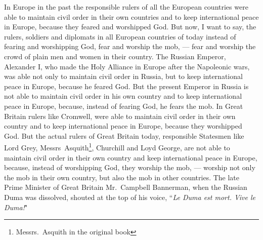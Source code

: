 In Europe in the past the responsible rulers of all the European countries were able to maintain civil order in their own countries and to keep international peace in Europe, because they feared and worshipped God.
But now, I want to say, the rulers, soldiers and diplomats in all European countries of today instead of fearing and worshipping God, fear and worship the mob, --- fear and worship the crowd of plain men and women in their country.
The Russian Emperor, Alexander I,  who made the Holy Alliance in Europe after the Napoleonic wars, was able not only to maintain civil order in Russia, but to keep international peace in Europe, because he feared God.
But the present Emperor in Russia is not able to maintain civil order in his own country and to keep international peace in Europe, because, instead of fearing God, he fears the mob.
In Great Britain rulers like Cromwell, were able to maintain civil order in their own country and to keep international peace in Europe, because they worshipped God.
But the actual rulers of Great Britain today, responsible Statesmen like Lord Grey,  Messrs~Asquith\footnote{Messrs.~Asquith in the original book},  Churchill  and Loyd George,  are not able to maintain civil order in their own country and keep international peace in Europe, because, instead of worshipping God, they worship the mob, --- worship not only the mob in their own country, but also the mob in other countries.
The late Prime Minister of Great Britain Mr.~Campbell Bannerman,  when the Russian Duma was dissolved, shouted at the top of his voice, ``\emph{Le Duma est mort. Vive le Duma!}"

